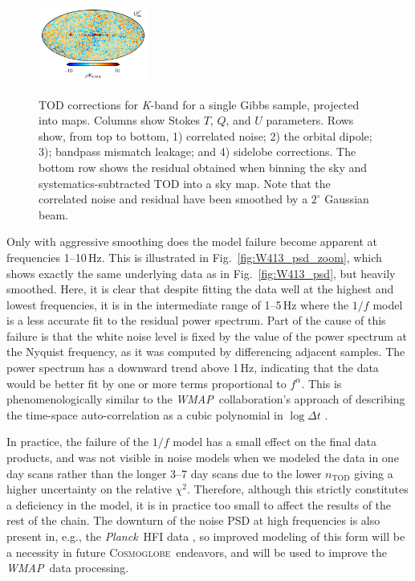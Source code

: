 \documentclass[twocolumn]{../../common/aa}
\def\WMAP{\emph{WMAP}}
\def\Planck{\emph{Planck}}
\newcommand{\cosmoglobe}{\textsc{Cosmoglobe}}
\newcommand{\K}[0]{\textit K}
\begin{document}
\begin{figure}[t]
	\includegraphics[width=0.32\textwidth]{figures/K_res_U.pdf}\\
	\caption{TOD corrections for \K-band for a single Gibbs sample, projected into maps. Columns show Stokes $T$, $Q$, and $U$ parameters. Rows show, from top to bottom, 1) correlated noise; 2) the orbital dipole; 3); bandpass mismatch leakage; and 4) sidelobe corrections. The bottom row shows the residual obtained when binning the sky and systematics-subtracted TOD into a sky map. Note that the correlated noise and residual have been smoothed by a $2^\circ$ Gaussian beam.}
	\label{fig:tod_corrections}
\end{figure}

Only with aggressive smoothing does the model failure become apparent
at frequencies 1--10\,Hz. This is illustrated in
Fig.~\ref{fig:W413_psd_zoom}, which shows exactly the same underlying
data as in Fig.~\ref{fig:W413_psd}, but heavily smoothed. Here, it is
clear that despite fitting the data well at the highest and lowest
frequencies, it is in the intermediate range of 1--5\,Hz where the
$1/f$ model is a less accurate fit to the residual power
spectrum. Part of the cause of this failure is that the white noise
level is fixed by the value of the power spectrum at the
Nyquist frequency, as it was computed by differencing adjacent
samples. The power spectrum has a downward trend above 1\,Hz,
indicating that the data would be better fit by one or more terms
proportional to $f^\alpha$. This is phenomenologically similar to the
\WMAP\ collaboration's approach of describing the time-space
auto-correlation as a cubic polynomial in $\log\Delta t$
\citep{jarosik2007}.

In practice, the failure of the $1/f$ model has a small effect on the final data products, and
was not visible in noise models when we modeled the data in one day scans
rather than the longer 3--7 day scans due to the lower $n_\mathrm{TOD}$ giving
a higher uncertainty on the relative $\chi^2$.  Therefore, although this
strictly constitutes a deficiency in the model, it is in practice too small to
affect the results of the rest of the chain. The downturn of the noise PSD at
high frequencies is also present in, e.g., the \Planck\ HFI data
\citep[Fig.~1]{planck2014-a10}, so improved modeling of this form will be a
necessity in future \cosmoglobe\ endeavors, and will be used to improve the
\WMAP\ data processing.
\end{document}
